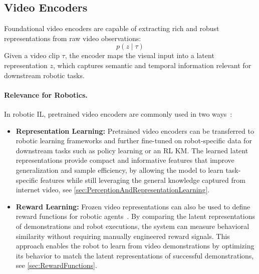 \subsection{Video Encoders}
\label{sec:VideoEncoder}
Foundational video encoders are capable of extracting rich and robust representations from raw video observations:
\begin{equation}
    p(z \mid \tau)
\end{equation}
Given a video clip $\tau$, the encoder maps the visual input into a latent representation $z$, which captures semantic and temporal information relevant for downstream robotic tasks.

\paragraph{Relevance for Robotics.}
In robotic \ac{IL}, pretrained video encoders are commonly used in two ways~\cite{McCarthy_2025}:
\begin{itemize}
    \item \textbf{Representation Learning:}
    Pretrained video encoders can be transferred to robotic learning frameworks and further fine-tuned on robot-specific data for downstream tasks such as policy learning or an \ac{RL} \ac{KM}. The learned latent representations provide compact and informative features that improve generalization and sample efficiency, by allowing the model to learn task-specific features while still leveraging the general knowledge captured from internet video, see \autoref{sec:PerceptionAndRepresentationLearning}.
    
    \item \textbf{Reward Learning:} 
    Frozen video representations can also be used to define reward functions for robotic agents~\cite{Nair2022R3MAU, Sontakke2023RoboCLIPOD, Fan2022MineDojoBO}. By comparing the latent representations of demonstrations and robot executions, the system can measure behavioral similarity without requiring manually engineered reward signals. This approach enables the robot to learn from video demonstrations by optimizing its behavior to match the latent representations of successful demonstrations, see \autoref{sec:RewardFunctions}.
\end{itemize}

